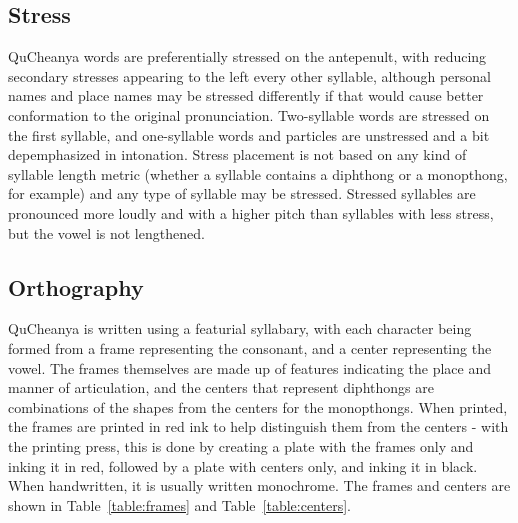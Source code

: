 \documentclass{article}
\begin{document}
\subsection{Stress}
QuCheanya words are preferentially stressed on the antepenult, with reducing secondary stresses appearing to the left every other syllable, although personal names and place names may be stressed differently if that would cause better conformation to the original pronunciation.  Two-syllable words are stressed on the first syllable, and one-syllable words and particles are unstressed and a bit depemphasized in intonation. Stress placement is not based on any kind of syllable length metric (whether a syllable contains a diphthong or a monopthong, for example) and any type of syllable may be stressed. Stressed syllables are pronounced more loudly and with a higher pitch than syllables with less stress, but the vowel is not lengthened.

\subsection{Orthography}
QuCheanya is written using a featurial syllabary, with each character being formed from a frame representing the consonant, and a center representing the vowel.  The frames themselves are made up of features indicating the place and manner of articulation, and the centers that represent diphthongs are combinations of the shapes from the centers for the monopthongs.  When printed, the frames are printed in red ink to help distinguish them from the centers - with the printing press, this is done by creating a plate with the frames only and inking it in red, followed by a plate with centers only, and inking it in black.  When handwritten, it is usually written monochrome.  The frames and centers are shown in Table~\ref{table:frames} and Table~\ref{table:centers}.
\end{document}
